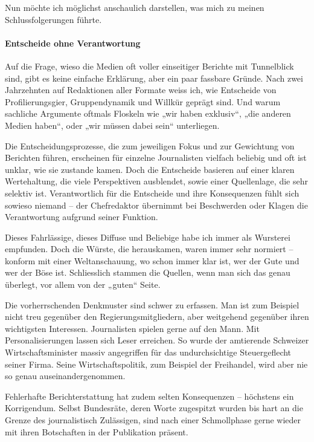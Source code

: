 Nun möchte ich möglichst anschaulich darstellen, was mich zu meinen
Schlussfolgerungen führte.

\hypertarget{entscheide-ohne-verantwortung}{%
\paragraph{Entscheide ohne
Verantwortung}\label{entscheide-ohne-verantwortung}}

Auf die Frage, wieso die Medien oft voller einseitiger Berichte mit
Tunnelblick sind, gibt es keine einfache Erklärung, aber ein paar
fassbare Gründe. Nach zwei Jahrzehnten auf Redaktionen aller Formate
weiss ich, wie Entscheide von Profilierungsgier, Gruppendynamik und
Willkür geprägt sind. Und warum sachliche Argumente oftmals Floskeln wie
„wir haben exklusiv``, „die anderen Medien haben``, oder „wir müssen
dabei sein`` unterliegen.

Die Entscheidungsprozesse, die zum jeweiligen Fokus und zur Gewichtung
von Berichten führen, erscheinen für einzelne Journalisten vielfach
beliebig und oft ist unklar, wie sie zustande kamen. Doch die Entscheide
basieren auf einer klaren Wertehaltung, die viele Perspektiven
ausblendet, sowie einer Quellenlage, die sehr selektiv ist.
Verantwortlich für die Entscheide und ihre Konsequenzen fühlt sich
sowieso niemand -- der Chefredaktor übernimmt bei Beschwerden oder
Klagen die Verantwortung aufgrund seiner Funktion.

Dieses Fahrlässige, dieses Diffuse und Beliebige habe ich immer als
Wursterei empfunden. Doch die Würste, die herauskamen, waren immer sehr
normiert -- konform mit einer Weltanschauung, wo schon immer klar ist,
wer der Gute und wer der Böse ist. Schliesslich stammen die Quellen,
wenn man sich das genau überlegt, vor allem von der „guten`` Seite.

Die vorherrschenden Denkmuster sind schwer zu erfassen. Man ist zum
Beispiel nicht treu gegenüber den Regierungsmitgliedern, aber weitgehend
gegenüber ihren wichtigsten Interessen. Journalisten spielen gerne auf
den Mann. Mit Personalisierungen lassen sich Leser erreichen. So wurde
der amtierende Schweizer Wirtschaftsminister massiv angegriffen für das
undurchsichtige Steuergeflecht seiner Firma. Seine Wirtschaftspolitik,
zum Beispiel der Freihandel, wird aber nie so genau auseinandergenommen.

Fehlerhafte Berichterstattung hat zudem selten Konsequenzen -- höchstens
ein Korrigendum. Selbst Bundesräte, deren Worte zugespitzt wurden bis
hart an die Grenze des journalistisch Zulässigen, sind nach einer
Schmollphase gerne wieder mit ihren Botschaften in der Publikation
präsent.

